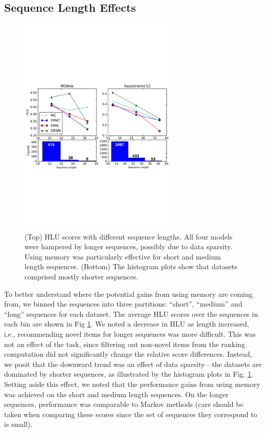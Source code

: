 \documentclass{sig-alternate-05-2015}
\begin{document}
\subsection{Sequence Length Effects}
\begin{figure}
\centering
\includegraphics[width=7.5cm]{images/SeqLenPerfAnnotated}		
\caption{(Top) HLU scores with different sequence lengths. All four models were hampered by longer sequences, possibly due to data sparsity. Using memory was particularly effective for short and medium length sequences. (Bottom) The histogram plots show that datasets comprised mostly shorter sequences.}
\label{fig:SeqLenResults}
\end{figure}

To better understand where the potential gains from using memory are coming from, we binned the sequences into three partitions: ``short'', ``medium'' and ``long'' sequences for each dataset. The average HLU scores over the sequences in each bin are shown in Fig \ref{fig:SeqLenResults}. We noted a decrease in HLU as length increased, i.e., recommending novel items for longer sequences was more difficult. This was not an effect of the task, since filtering out non-novel items from the ranking computation did not significantly change the relative score differences. Instead, we posit that the downward trend was an effect of data sparsity---the datasets are dominated by shorter sequences, as illustrated by the histogram plots in Fig. \ref{fig:SeqLenResults}. Setting aside this effect, we noted that the performance gains from using memory was achieved on the short and medium length sequences. On the longer sequences, performance was comparable to Markov methods (care should be taken when comparing these scores since the set of sequences they correspond to is small). 
\end{document}
